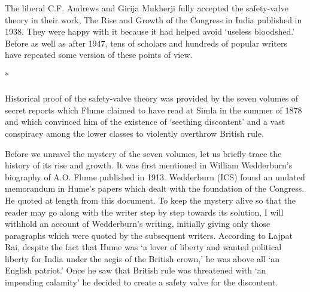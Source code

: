 The liberal C.F. Andrews and Girija Mukherji fully accepted the safety-valve theory in their work, The Rise and Growth of the Congress in India published in 1938. They were happy with it because it had helped avoid `useless bloodshed.' Before as well as after 1947, tens of scholars and hundreds of popular writers have repeated some version of these points of view.

\begin{center}*\end{center}

\paragraph*{}
Historical proof of the safety-valve theory was provided by the seven volumes of secret reports which Flume claimed to have read at Simla in the summer of 1878 and which convinced him of the existence of `seething discontent' and a vast conspiracy among the lower classes to violently overthrow British rule.

Before we unravel the mystery of the seven volumes, let us briefly trace the history of its rise and growth. It was first mentioned in William Wedderburn's biography of A.O. Flume published in 1913. Wedderburn (ICS) found an undated memorandum in Hume's papers which dealt with the foundation of the Congress. He quoted at length from this document. To keep the mystery alive so that the reader may go along with the writer step by step towards its solution, I will withhold an account of Wedderburn's writing, initially giving only those paragraphs which were quoted by the subsequent writers. According to Lajpat Rai, despite the fact that Hume was `a lover of liberty and wanted political liberty for India under the aegis of the British crown,' he was above all `an English patriot.' Once he saw that British rule was threatened with `an impending calamity' he decided to create a safety valve for the discontent.

